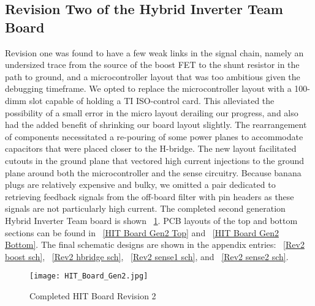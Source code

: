\subsection{Revision Two of the Hybrid Inverter Team Board}
Revision one was found to have a few weak links in the signal chain, namely an undersized trace from the source of the boost FET to the shunt resistor in the path to ground, and a microcontroller layout that was too ambitious given the debugging timeframe. We opted to replace the microcontroller layout with a 100-dimm slot capable of holding a TI ISO-control card. This alleviated the possibility of a small error in the micro layout derailing our progress, and also had the added benefit of shrinking our board layout slightly. The rearrangement of components necessitated a re-pouring of some power planes to accommodate capacitors that were placed closer to the H-bridge. The new layout facilitated cutouts in the ground plane that vectored high current injections to the ground plane around both the microcontroller and the sense circuitry. Because banana plugs are relatively expensive and bulky, we omitted a pair dedicated to retrieving feedback signals from the off-board filter with pin headers as these signals are not particularly high current. The completed second generation Hybrid Inverter Team board is shown ~\ref{HIT Board Gen2}. PCB layouts of the top and bottom sections can be found in ~\ref{HIT Board Gen2 Top} and ~\ref{HIT Board Gen2 Bottom}. The final schematic designs are shown in the appendix entries: ~\ref{Rev2 boost sch}, ~\ref{Rev2 hbridge sch}, ~\ref{Rev2 sense1 sch}, and ~\ref{Rev2 sense2 sch}.

\begin{figure}
\centering
\texttt{[image: HIT\_Board\_Gen2.jpg]}
\caption{Completed HIT Board Revision 2}
\label{HIT Board Gen2}
\end{figure}
